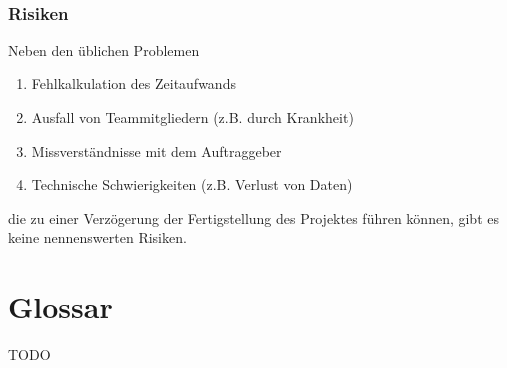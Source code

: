 \documentclass{article}
\begin{document}
	~\newpage
	\subsubsection{Risiken}
	Neben den üblichen Problemen
	\begin{enumerate}[--]
		\item{Fehlkalkulation des Zeitaufwands}
		\item{Ausfall von Teammitgliedern (z.B. durch Krankheit)}
		\item{Missverständnisse mit dem Auftraggeber}
		\item{Technische Schwierigkeiten (z.B. Verlust von Daten)}
	\end{enumerate}
	die zu einer Verzögerung der Fertigstellung des Projektes führen können, gibt es keine nennenswerten Risiken.
	
	\section{Glossar}
	
	TODO
	
	\glsaddall
	\printglossaries
\end{document}
